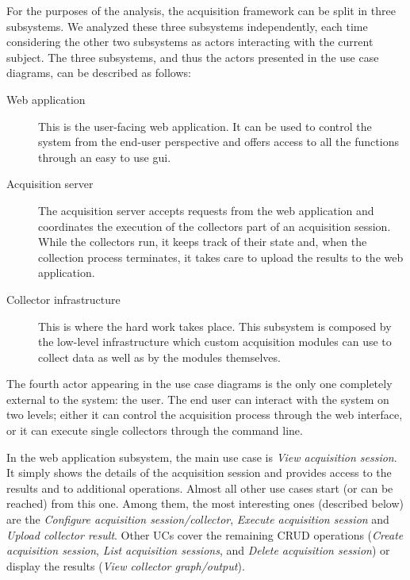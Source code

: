For the purposes of the analysis, the acquisition framework can be split in three subsystems. We analyzed these three subsystems independently, each time considering the other two subsystems as actors interacting with the current subject. The three subsystems, and thus the actors presented in the use case diagrams, can be described as follows:

\begin{description}
  \item[Web application] This is the user-facing web application. It can be used to control the system from the end-user perspective and offers access to all the functions through an easy to use \gls{gui}.
  \item[Acquisition server] The acquisition server accepts requests from the web application and coordinates the execution of the collectors part of an acquisition session. While the collectors run, it keeps track of their state and, when the collection process terminates, it takes care to upload the results to the web application.
  \item[Collector infrastructure] This is where the hard work takes place. This subsystem is composed by the low-level infrastructure which custom acquisition modules can use to collect data as well as by the modules themselves.
\end{description}

The fourth actor appearing in the use case diagrams is the only one completely external to the system: the user. The end user can interact with the system on two levels; either it can control the acquisition process through the web interface, or it can execute single collectors through the command line.

In the web application subsystem, the main use case is \emph{View acquisition session}. It simply shows the details of the acquisition session and provides access to the results and to additional operations. Almost all other use cases start (or can be reached) from this one. Among them, the most interesting ones (described below) are the \emph{Configure acquisition session/collector}, \emph{Execute acquisition session} and \emph{Upload collector result}. Other UCs cover the remaining CRUD operations (\emph{Create acquisition session}, \emph{List acquisition sessions}, and \emph{Delete acquisition session}) or display the results (\emph{View collector graph/output}).

